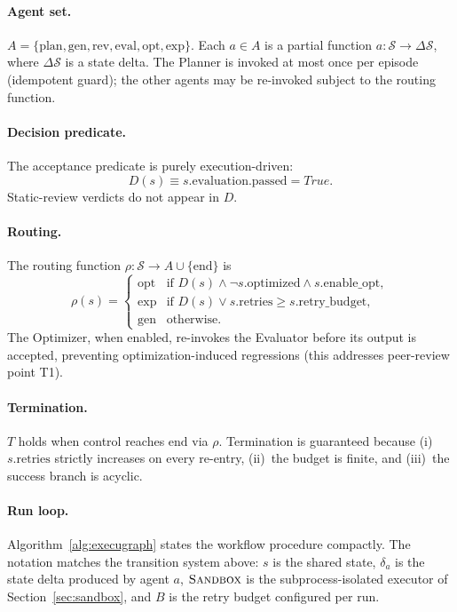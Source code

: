 \documentclass[journal]{IEEEtran}
\begin{document}
\paragraph{Agent set.}
$A = \{\text{plan}, \text{gen}, \text{rev}, \text{eval}, \text{opt}, \text{exp}\}$. Each $a \in A$ is a partial function $a: \mathcal{S} \rightarrow \Delta\mathcal{S}$, where $\Delta\mathcal{S}$ is a state delta. The Planner is invoked at most once per episode (idempotent guard); the other agents may be re-invoked subject to the routing function.

\paragraph{Decision predicate.}
The acceptance predicate is purely execution-driven:
\begin{equation}
D(s) \equiv s.\text{evaluation.passed} = \mathit{True}.
\end{equation}
Static-review verdicts do not appear in $D$.

\paragraph{Routing.}
The routing function $\rho: \mathcal{S} \rightarrow A \cup \{\text{end}\}$ is
\begin{equation}
\rho(s) =
\begin{cases}
\text{opt} & \text{if } D(s) \wedge \neg s.\text{optimized} \wedge s.\text{enable\_opt}, \\
\text{exp} & \text{if } D(s) \vee s.\text{retries} \geq s.\text{retry\_budget}, \\
\text{gen} & \text{otherwise}.
\end{cases}
\end{equation}
The Optimizer, when enabled, re-invokes the Evaluator before its output is accepted, preventing optimization-induced regressions (this addresses peer-review point T1).

\paragraph{Termination.}
$T$ holds when control reaches $\text{end}$ via $\rho$. Termination is guaranteed because (i)~$s.\text{retries}$ strictly increases on every  re-entry, (ii)~the budget is finite, and (iii)~the success branch is acyclic.

\paragraph{Run loop.}
Algorithm~\ref{alg:execugraph} states the workflow procedure compactly. The notation matches the transition system above: $s$ is the shared state, $\delta_a$ is the state delta produced by agent $a$, $\textsc{Sandbox}$ is the subprocess-isolated executor of Section~\ref{sec:sandbox}, and $B$ is the retry budget configured per run.
\end{document}
